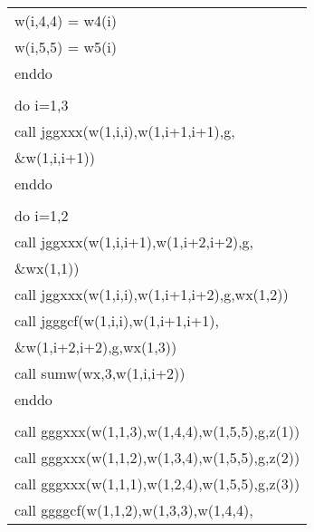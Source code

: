 \begin{center}
{\begin{supertabular}{l}
     \hspace{1em}    w(i,4,4) = w4(i)\\
     \hspace{1em}    w(i,5,5) = w5(i)\\
     \hspace{0.5em} enddo\\
\\
     \hspace{0.5em} do i=1,3\\
     \hspace{1em} call jggxxx(w(1,i,i),w(1,i+1,i+1),g,\\
     \&\hspace{7em}w(1,i,i+1))     \\
     \hspace{0.5em} enddo\\
\\
      \hspace{0.5em} do i=1,2  \\
      \hspace{1em}    call jggxxx(w(1,i,i+1),w(1,i+2,i+2),g,\\
      \&\hspace{7em}wx(1,1))\\
      \hspace{1em}    call jggxxx(w(1,i,i),w(1,i+1,i+2),g,wx(1,2))    \\
      \hspace{1em}    call jgggcf(w(1,i,i),w(1,i+1,i+1),\\
      \hspace{0.2em}\&\hspace{6.8em}w(1,i+2,i+2),g,wx(1,3)) \\
      \hspace{1em}    call sumw(wx,3,w(1,i,i+2))\\
      \hspace{0.5em} enddo   \\
      \\
      \hspace{0.5em} call gggxxx(w(1,1,3),w(1,4,4),w(1,5,5),g,z(1))   \\
      \hspace{0.5em} call gggxxx(w(1,1,2),w(1,3,4),w(1,5,5),g,z(2))     \\
      \hspace{0.5em} call gggxxx(w(1,1,1),w(1,2,4),w(1,5,5),g,z(3))      \\
      \hspace{0.5em} call ggggcf(w(1,1,2),w(1,3,3),w(1,4,4),\\

\end{supertabular}}
\end{center}
